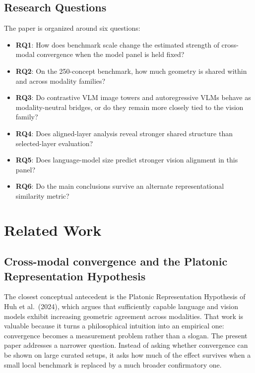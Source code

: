 \documentclass[10pt]{article}
\providecommand{\tightlist}{%
  \setlength{\itemsep}{0pt}\setlength{\parskip}{0pt}}
\begin{document}
\subsection{Research Questions}\label{research-questions}

The paper is organized around six questions:

\begin{itemize}
\tightlist
\item
  \textbf{RQ1}: How does benchmark scale change the estimated strength
  of cross-modal convergence when the model panel is held fixed?
\item
  \textbf{RQ2}: On the 250-concept benchmark, how much geometry is
  shared within and across modality families?
\item
  \textbf{RQ3}: Do contrastive VLM image towers and autoregressive VLMs
  behave as modality-neutral bridges, or do they remain more closely
  tied to the vision family?
\item
  \textbf{RQ4}: Does aligned-layer analysis reveal stronger shared
  structure than selected-layer evaluation?
\item
  \textbf{RQ5}: Does language-model size predict stronger vision
  alignment in this panel?
\item
  \textbf{RQ6}: Do the main conclusions survive an alternate
  representational similarity metric?
\end{itemize}

\section{Related Work}\label{related-work}

\subsection{Cross-modal convergence and the Platonic Representation
Hypothesis}\label{cross-modal-convergence-and-the-platonic-representation-hypothesis}

The closest conceptual antecedent is the Platonic Representation
Hypothesis of Huh et al.~(2024), which argues that sufficiently capable
language and vision models exhibit increasing geometric agreement across
modalities. That work is valuable because it turns a philosophical
intuition into an empirical one: convergence becomes a measurement
problem rather than a slogan. The present paper addresses a narrower
question. Instead of asking whether convergence can be shown on large
curated setups, it asks how much of the effect survives when a small
local benchmark is replaced by a much broader confirmatory one.
\end{document}
